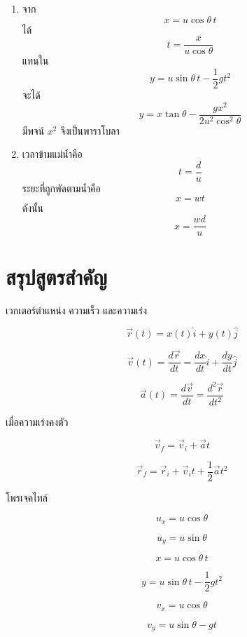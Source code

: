 \begin{enumerate}
    \item
    จาก
    \[
    x=u\cos\theta\,t
    \]
    ได้
    \[
    t=\frac{x}{u\cos\theta}
    \]
    แทนใน
    \[
    y=u\sin\theta\,t-\frac{1}{2}gt^2
    \]
    จะได้
    \[
    y=x\tan\theta-\frac{gx^2}{2u^2\cos^2\theta}
    \]
    มีพจน์ $x^2$ จึงเป็นพาราโบลา

    \item
    เวลาข้ามแม่น้ำคือ
    \[
    t=\frac{d}{u}
    \]
    ระยะที่ถูกพัดตามน้ำคือ
    \[
    x=wt
    \]
    ดังนั้น
    \[
    x=\frac{wd}{u}
    \]
\end{enumerate}

\section{สรุปสูตรสำคัญ}

\begin{tcolorbox}[title=สรุปบทที่ 4: การเคลื่อนที่ในสองมิติ]
เวกเตอร์ตำแหน่ง ความเร็ว และความเร่ง

\[
\vec{r}(t)=x(t)\hat{i}+y(t)\hat{j}
\]

\[
\vec{v}(t)=\frac{d\vec{r}}{dt}
=
\frac{dx}{dt}\hat{i}
+
\frac{dy}{dt}\hat{j}
\]

\[
\vec{a}(t)=\frac{d\vec{v}}{dt}
=
\frac{d^2\vec{r}}{dt^2}
\]

เมื่อความเร่งคงตัว

\[
\vec{v}_f=\vec{v}_i+\vec{a}t
\]

\[
\vec{r}_f=\vec{r}_i+\vec{v}_it+\frac{1}{2}\vec{a}t^2
\]

โพรเจคไทล์

\[
u_x=u\cos\theta
\]

\[
u_y=u\sin\theta
\]

\[
x=u\cos\theta\,t
\]

\[
y=u\sin\theta\,t-\frac{1}{2}gt^2
\]

\[
v_x=u\cos\theta
\]

\[
v_y=u\sin\theta-gt
\]
\end{tcolorbox}


